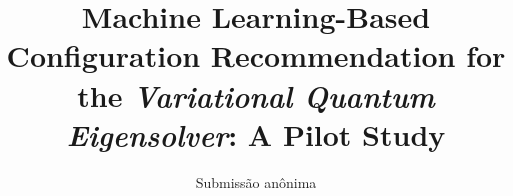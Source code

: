 \documentclass[12pt]{article}
\title{Machine Learning-Based Configuration Recommendation for the
\textit{Variational Quantum Eigensolver}: A Pilot Study}
\author{Submissão anônima}
\begin{document}
\maketitle

\begin{abstract}

\end{abstract}

\begin{resumo}

\end{resumo}










\end{document}
